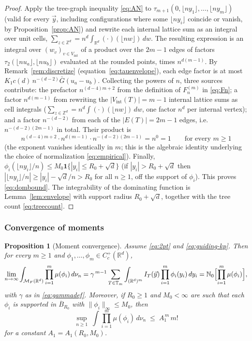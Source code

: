 \documentclass[11pt]{article}
\newtheorem{proposition}[theorem]{Proposition}
\theoremstyle{definition}
\theoremstyle{remark}
\newcommand{\R}{\mathbb{R}}
\newcommand{\Z}{\mathbb{Z}}
\newcommand{\bN}{{\mathbb{N}_0}}                 %
\newcommand{\cM}{{\mathcal{M}_F(\R^d)}}          %
\newcommand{\Cc}{C_c^+(\R^d)}
\newcommand{\T}{\mathbb{T}}                    %
\newcommand{\fl}[1]{\lfloor #1\rfloor}
\numberwithin{equation}{section}
\theoremstyle{plain}
\theoremstyle{definition}
\theoremstyle{remark}
\theoremstyle{plain}
\begin{document}
\begin{proof}
Apply the tree-graph inequality \eqref{eq:AN} to
$\tau_{m+1}(0,\fl{ny_1},\dots,\fl{ny_m})$ (valid for every $\vec y$,
including configurations where some $\fl{ny_i}$ coincide or vanish, by
Proposition~\ref{prop:AN}) and rewrite each internal lattice
sum as an integral over unit cells, $\sum_{z\in\Z^d}=n^d\int_{\R^d}
(\cdot)(\fl{nw})\,dw$. The resulting expression is an integral over
$(w_v)_{v\in V_{\mathrm{int}}}$ of a product over the $2m-1$ edges of factors
$\tau_2(\fl{nu_a},\fl{nu_b})$ evaluated at the rounded points, times
$n^{d(m-1)}$. By Remark~\ref{rem:discretize}
(equation~\eqref{eq:tauenvelope}), each edge factor is at most
$K_1c(d)\,n^{-(d-2)}\bar G(u_a-u_b)$. Collecting the powers of $n$,
three sources contribute: the prefactor $n^{(d-4)m+2}$ from the definition of
$F^{(m)}_n$ in \eqref{eq:Fn}; a factor $n^{d(m-1)}$ from rewriting the
$|V_{\mathrm{int}}(T)|=m-1$ internal lattice sums as cell integrals
($\sum_{z\in\Z^d}=n^d\int(\cdot)(\fl{nw})\,dw$, one factor $n^d$ per internal
vertex); and a factor $n^{-(d-2)}$ from each of the $|E(T)|=2m-1$ edges, i.e.\
$n^{-(d-2)(2m-1)}$ in total. Their product is
\[
n^{(d-4)m+2}\cdot n^{d(m-1)}\cdot n^{-(d-2)(2m-1)}=n^{0}=1
\qquad\text{for every }m\ge1
\]
(the exponent vanishes identically in $m$; this is the algebraic
identity underlying the choice of normalization \eqref{eq:empirical}).
Finally, $\phi_i(\fl{ny_i}/n)\le M_0\mathbf 1\{|y_i|\le R_0+\sqrt d\}$
(if $|y_i|>R_0+\sqrt d$ then $|\fl{ny_i}/n|\ge|y_i|-\sqrt d/n>R_0$ for all $n\ge1$, off the support of $\phi_i$). This proves
\eqref{eq:dombound}. The integrability of the dominating function is
Lemma~\ref{lem:envelope} with support radius $R_0+\sqrt d$, together with the
tree count \eqref{eq:treecount}.

\end{proof}

\subsubsection{Convergence of moments}

\begin{proposition}[Moment convergence]\label{prop:momconv}
 Assume \eqref{eq:2pt} and \eqref{eq:guiding-kp}. Then for every
$m\ge1$ and $\phi_1,\dots,\phi_m\in\Cc$,
\begin{equation}\label{eq:momconv}
\lim_{n\to\infty}\int_\cM\prod_{i=1}^m\mu(\phi_i)\,d\nu_n
=\gamma^{\,m-1}\sum_{T\in\T_m}\int_{(\R^d)^m}I_T(\vec y)
\prod_{i=1}^m\phi_i(y_i)\,dy_i
=\bN\Bigl[\prod_{i=1}^m\mu(\phi_i)\Bigr],
\end{equation}
with $\gamma$ as in \eqref{eq:gammadef}. Moreover, if $R_0\ge1$ and
$M_0<\infty$ are such that each $\phi_i$ is supported in $\overline B_{R_0}$ with
$\|\phi_i\|_\infty\le M_0$, then
\begin{equation}\label{eq:uniformmoments}
\sup_{n\ge1}\;\int\prod_{i=1}^m\mu(\phi_i)\,d\nu_n
\;\le\;A_1^{\,m}\,m!
\end{equation}
for a constant $A_1=A_1(R_0,M_0)$.
\end{proposition}
\end{document}
